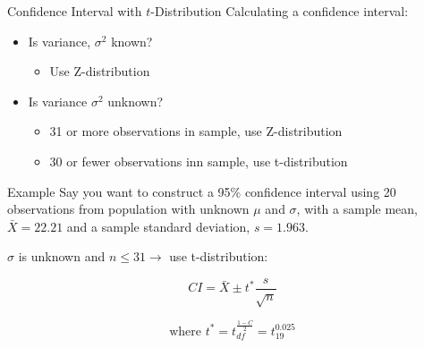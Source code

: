 \documentclass{beamer}
\begin{document}

\begin{frame}{Confidence Interval with $t$-Distribution}
	Calculating a confidence interval:
	\begin{itemize}
		\item Is variance, $\sigma^2$ known?
		      \begin{itemize}
		      	\item Use Z-distribution
		      \end{itemize}
		\item Is variance $\sigma^2$ unknown?
		      \begin{itemize}
		      	\item 31 or more observations in sample, use Z-distribution
		      	\item 30 or fewer observations inn sample, use t-distribution
		      \end{itemize}
	\end{itemize}
\end{frame}


\begin{frame}{Example}
	Say you want to construct a 95\% confidence interval using 20 observations from population with unknown $\mu$ and $\sigma$, with a sample mean, $\bar{X}=22.21$ and a sample standard deviation, $s=1.963$. 
	
	$\sigma$ is unknown and $n \leq 31 \rightarrow$ use t-distribution:
	
	\[
		CI = \bar{X} \pm t^* \frac{s}{\sqrt{n}}
	\]
	
	\[
		\text{where }t^* = t^\frac{1-C}{2}_{df}=t^{0.025}_{19}
	\]
\end{frame}
\end{document}
